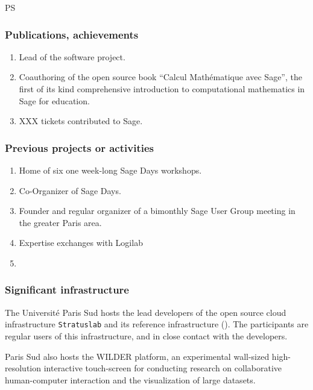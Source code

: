 \begin {sitedescription}{PS}
\subsubsection*{Publications, achievements}


\begin{enumerate}
\item Lead of the \SageCombinat software project.
\item Coauthoring of the open source book ``Calcul Mathématique avec
  Sage'', the first of its kind comprehensive introduction to
  computational mathematics in Sage for education.
\item XXX tickets contributed to Sage.
\end{enumerate}


\subsubsection*{Previous projects or activities}

\begin{enumerate}
\item Home of six one week-long Sage Days workshops.
\item Co-Organizer of  Sage Days.
\item Founder and regular organizer of a bimonthly Sage User Group
  meeting in the greater Paris area.
\item Expertise exchanges with Logilab
\item {}
\end{enumerate}

\subsubsection*{Significant infrastructure}

The Université Paris Sud hosts the lead developers of the open source
cloud infrastructure \texttt{Stratuslab} and its reference
infrastructure (). The participants are regular users
of this infrastructure, and in close contact with the developers.

Paris Sud also hosts the WILDER platform, an experimental wall-sized
high-resolution interactive touch-screen for conducting research on
collaborative human-computer interaction and the visualization of
large datasets.
\end{sitedescription}
